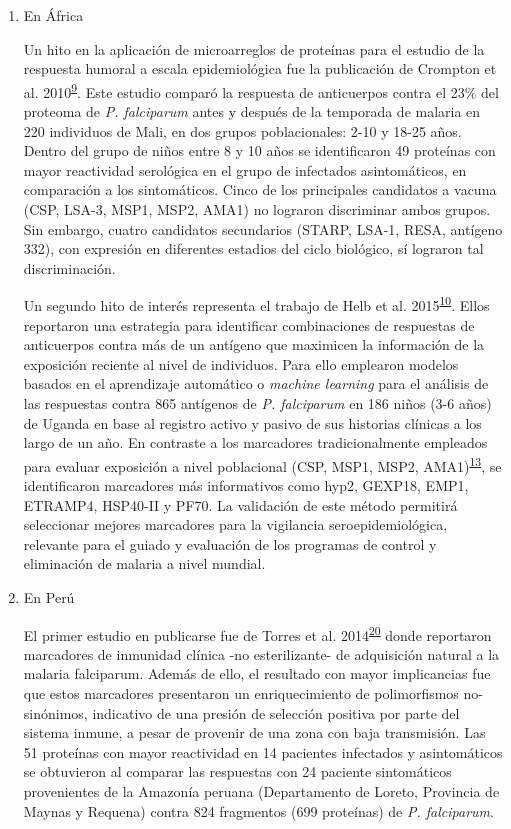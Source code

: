 \documentclass[]{article}
\begin{document}
\begin{enumerate}
\def\labelenumi{\alph{enumi}.}
\item
  En África

  Un hito en la aplicación de microarreglos de proteínas para el estudio
  de la respuesta humoral a escala epidemiológica fue la publicación de
  Crompton et al.
  2010\textsuperscript{\protect\hyperlink{ref-crompton2010}{9}}. Este
  estudio comparó la respuesta de anticuerpos contra el 23\% del
  proteoma de \emph{P. falciparum} antes y después de la temporada de
  malaria en 220 individuos de Mali, en dos grupos poblacionales: 2-10 y
  18-25 años. Dentro del grupo de niños entre 8 y 10 años se
  identificaron 49 proteínas con mayor reactividad serológica en el
  grupo de infectados asintomáticos, en comparación a los sintomáticos.
  Cinco de los principales candidatos a vacuna (CSP, LSA-3, MSP1, MSP2,
  AMA1) no lograron discriminar ambos grupos. Sin embargo, cuatro
  candidatos secundarios (STARP, LSA-1, RESA, antígeno 332), con
  expresión en diferentes estadios del ciclo biológico, sí lograron tal
  discriminación.

  Un segundo hito de interés representa el trabajo de Helb et al.
  2015\textsuperscript{\protect\hyperlink{ref-Helb2015exposure}{10}}.
  Ellos reportaron una estrategia para identificar combinaciones de
  respuestas de anticuerpos contra más de un antígeno que maximicen la
  información de la exposición reciente al nivel de individuos. Para
  ello emplearon modelos basados en el aprendizaje automático o
  \emph{machine learning} para el análisis de las respuestas contra 865
  antígenos de \emph{P. falciparum} en 186 niños (3-6 años) de Uganda en
  base al registro activo y pasivo de sus historias clínicas a los largo
  de un año. En contraste a los marcadores tradicionalmente empleados
  para evaluar exposición a nivel poblacional (CSP, MSP1, MSP2,
  AMA1)\textsuperscript{\protect\hyperlink{ref-elliott2014}{13}}, se
  identificaron marcadores más informativos como hyp2, GEXP18, EMP1,
  ETRAMP4, HSP40-II y PF70. La validación de este método permitirá
  seleccionar mejores marcadores para la vigilancia seroepidemiológica,
  relevante para el guiado y evaluación de los programas de control y
  eliminación de malaria a nivel mundial.
\item
  En Perú

  El primer estudio en publicarse fue de Torres et al.
  2014\textsuperscript{\protect\hyperlink{ref-Torres2014asymptomatic}{20}}
  donde reportaron marcadores de inmunidad clínica -no esterilizante- de
  adquisición natural a la malaria falciparum. Además de ello, el
  resultado con mayor implicancias fue que estos marcadores presentaron
  un enriquecimiento de polimorfismos no-sinónimos, indicativo de una
  presión de selección positiva por parte del sistema inmune, a pesar de
  provenir de una zona con baja transmisión. Las 51 proteínas con mayor
  reactividad en 14 pacientes infectados y asintomáticos se obtuvieron
  al comparar las respuestas con 24 paciente sintomáticos provenientes
  de la Amazonía peruana (Departamento de Loreto, Provincia de Maynas y
  Requena) contra 824 fragmentos (699 proteínas) de \emph{P.
  falciparum}.


\end{enumerate}
\end{document}
